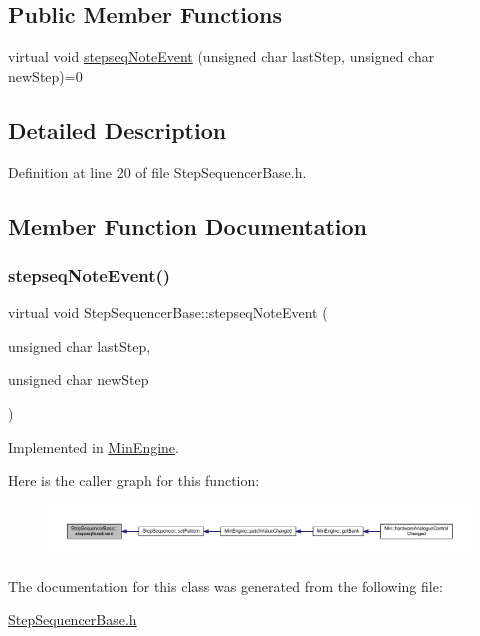 \subsection*{Public Member Functions}
\begin{DoxyCompactItemize}
\item 
virtual void \hyperlink{class_step_sequencer_base_a9f32f8ae8eb8afb1c2ea39ed8d856657}{stepseq\+Note\+Event} (unsigned char last\+Step, unsigned char new\+Step)=0
\end{DoxyCompactItemize}


\subsection{Detailed Description}


Definition at line 20 of file Step\+Sequencer\+Base.\+h.



\subsection{Member Function Documentation}
\mbox{\label{class_step_sequencer_base_a9f32f8ae8eb8afb1c2ea39ed8d856657}} 
\subsubsection{\texorpdfstring{stepseq\+Note\+Event()}{stepseqNoteEvent()}}
{\footnotesize\ttfamily virtual void Step\+Sequencer\+Base\+::stepseq\+Note\+Event (\begin{DoxyParamCaption}\item[{unsigned char}]{last\+Step,  }\item[{unsigned char}]{new\+Step }\end{DoxyParamCaption})\hspace{0.3cm}{\ttfamily [pure virtual]}}



Implemented in \hyperlink{class_min_engine_a46ab2a887b8c83c9b484304778bc01a1}{Min\+Engine}.

Here is the caller graph for this function\+:
\nopagebreak
\begin{figure}[H]
\begin{center}
\leavevmode
\includegraphics[width=350pt]{d1/d4a/class_step_sequencer_base_a9f32f8ae8eb8afb1c2ea39ed8d856657_icgraph}
\end{center}
\end{figure}


The documentation for this class was generated from the following file\+:\begin{DoxyCompactItemize}
\item 
\hyperlink{_step_sequencer_base_8h}{Step\+Sequencer\+Base.\+h}\end{DoxyCompactItemize}
